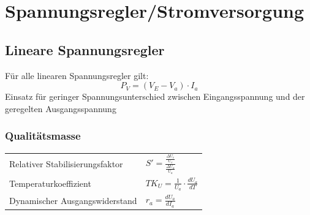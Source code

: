 \newpage
\section{Spannungsregler/Stromversorgung} 
	\subsection{Lineare Spannungsregler} 
		Für alle linearen Spannungsregler gilt: 
		\begin{equation*}
			P_{V}=(V_{E}-V_{a}) \cdot I_{a}
		\end{equation*}
		Einsatz für geringer Spannungsunterschied zwischen Eingangsspannung und der
		geregelten Ausgangsspannung \\
		
		\subsubsection{Qualitätsmasse}
			\begin{tabular}{l l}
				Relativer Stabilisierungsfaktor & $S' = \frac{\frac{\Delta U_e}{U_e}}
														{\frac{\Delta U_a}{U_a}}$ \\
				Temperaturkoeffizient & $TK_U = \frac{1}{U_a} \cdot \frac{dU_a}{dT}$ \\
				Dynamischer Ausgangswiderstand & $r_a = \frac{dU_a}{dI_a}$ \\
			\end{tabular} \\

